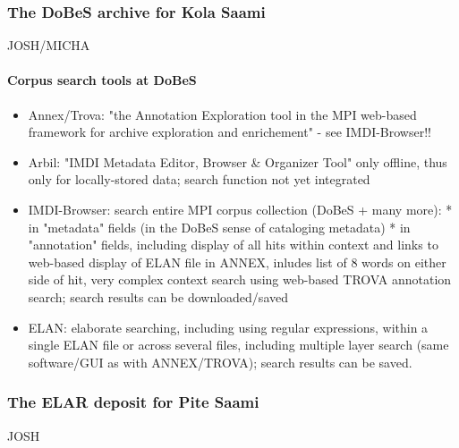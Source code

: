 \documentclass[a4paper,12pt]{article}
\begin{document}
\subsubsection{The DoBeS archive for Kola Saami}
JOSH/MICHA

\paragraph{Corpus search tools at DoBeS}
\begin{itemize}
\item Annex/Trova: "the Annotation Exploration tool in the MPI web-based framework for archive exploration and enrichement" - see IMDI-Browser!!
\item Arbil: "IMDI Metadata Editor, Browser \& Organizer Tool" only offline, thus only for locally-stored data; search function not yet integrated
\item IMDI-Browser: search entire MPI corpus collection (DoBeS + many more):
	* in "metadata" fields (in the DoBeS sense of cataloging metadata)
	* in "annotation" fields, including display of all hits within context and links to web-based display of ELAN file in ANNEX, inludes list of 8 words on either side of hit, very complex context search using web-based TROVA annotation search; search results can be downloaded/saved
\item ELAN: elaborate searching, including using regular expressions, within a single ELAN file or across several files, including multiple layer search (same software/GUI as with ANNEX/TROVA); search results can be saved.	
\end{itemize}


\subsubsection{The ELAR deposit for Pite Saami}
JOSH
\end{document}
